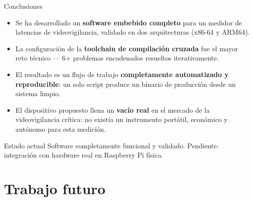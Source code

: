 \documentclass[aspectratio=169,11pt]{beamer}
\begin{document}
\begin{frame}{Conclusiones}

\begin{itemize}
    \item Se ha desarrollado un \textbf{software embebido completo} para un medidor de latencias de videovigilancia, validado en dos arquitecturas (x86-64 y ARM64).
    
    \item La configuración de la \textbf{toolchain de compilación cruzada} fue el mayor reto técnico — 6+ problemas encadenados resueltos iterativamente.
    
    \item El resultado es un flujo de trabajo \textbf{completamente automatizado y reproducible}: un solo script produce un binario de producción desde un sistema limpio.
    
    \item El dispositivo propuesto llena un \textbf{vacío real} en el mercado de la videovigilancia crítica: no existía un instrumento portátil, económico y autónomo para esta medición.
\end{itemize}

\vspace{0.3cm}
\begin{block}{Estado actual}
Software completamente funcional y validado. Pendiente: integración con hardware real en Raspberry Pi física.
\end{block}

\end{frame}

\section{Trabajo futuro}
\end{document}
